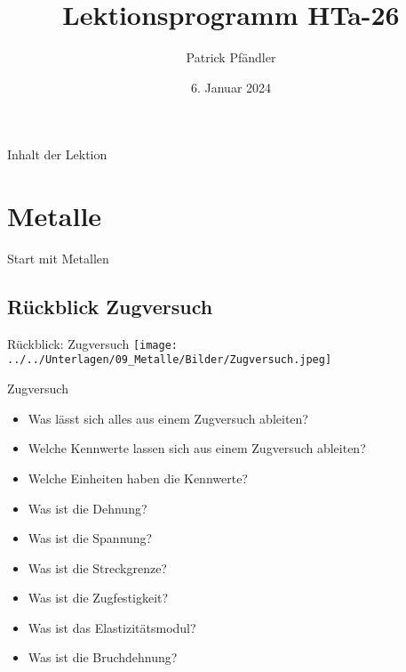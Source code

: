 





\title{\textbf{Lektionsprogramm HTa-26}}
\author{Patrick Pfändler}
\date{6. Januar 2024}




\frame{\titlepage}

\begin{frame}{Inhalt der Lektion}
	\tableofcontents
\end{frame}


\section{Metalle}
\BlueSectionSlide
\begin{frame}{Start mit Metallen}
\end{frame}

\subsection{Rückblick Zugversuch}
\begin{frame}{Rückblick: Zugversuch}
	\centering
	\texttt{[image: ../../Unterlagen/09\_Metalle/Bilder/Zugversuch.jpeg]}
\end{frame}


\begin{frame}{Zugversuch}
	\begin{Fragenblock}
		\begin{itemize}
			\item Was lässt sich alles aus einem Zugversuch ableiten?
			\item Welche Kennwerte lassen sich aus einem Zugversuch ableiten?
			\item Welche Einheiten haben die Kennwerte?
			\item Was ist die Dehnung?
			\item Was ist die Spannung?
			\item Was ist die Streckgrenze?
			\item Was ist die Zugfestigkeit?
			\item Was ist das Elastizitätsmodul?
			\item Was ist die Bruchdehnung?
		\end{itemize}
	\end{Fragenblock}
\end{frame}





